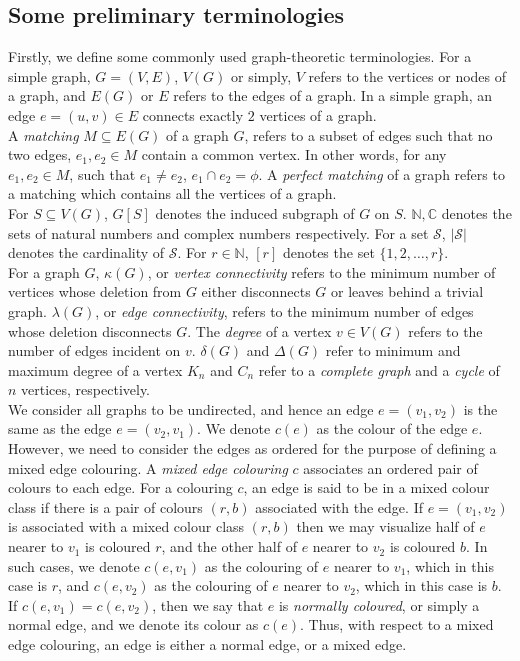\documentclass[11pt]{article}
\begin{document}
\subsection*{Some preliminary terminologies}
Firstly, we define some commonly used graph-theoretic terminologies. For a simple graph, $G=(V,E)$, $V(G)$ or simply, $V$ refers to the vertices or nodes of a graph, and $E(G)$ or $E$ refers to the edges of a graph. In a simple graph, an edge $e=(u,v) \in E$ connects exactly $2$ vertices of a graph.\\
A \textit{matching} $M \subseteq E(G)$ of a graph $G$, refers to a subset of edges such that no two edges, $e_1, e_2 \in M$ contain a common vertex. In other words, for any $e_1, e_2 \in M$, such that $e_1 \neq e_2$, $e_1 \cap e_2=\phi$. A \textit{perfect matching} of a graph refers to a matching which contains all the vertices of a graph.\\
For $S \subseteq V(G)$, $G[S]$ denotes the induced subgraph of $G$ on $S$. $\mathbb{N}, \mathbb{C}$ denotes the sets of natural numbers and complex numbers respectively. For a set $\mathcal{S}$, $|\mathcal{S}|$ denotes the cardinality of $\mathcal{S}$. For $r \in \mathbb{N}$, $[r]$ denotes the set $\{1, 2, \dots, r\}$.\\
For a graph $G$, $\kappa(G)$, or \textit{vertex connectivity} refers to the minimum number of vertices whose deletion from $G$ either disconnects $G$ or leaves behind a trivial graph. $\lambda(G)$, or \textit{edge connectivity}, refers to the minimum number of edges whose deletion disconnects $G$.
The \textit{degree} of a vertex $v \in V(G)$ refers to the number of edges incident on $v$.  $\delta(G)$ and $\Delta(G)$ refer to minimum and maximum degree of a vertex  $K_n$ and $C_n$ refer to a \textit{complete graph} and a \textit{cycle} of $n$ vertices, respectively.\\
We consider all graphs to be undirected, and hence an edge $e=(v_1,v_2)$ is the same as the edge $e=(v_2,v_1)$. We denote $c(e)$ as the colour of the edge $e$. However, we need to consider the edges as ordered for the purpose of defining a mixed edge colouring. A \textit{mixed edge colouring} $c$ associates an ordered pair of colours to each edge. For a colouring $c$, an edge is said to be in a mixed colour class if there is a pair of colours $(r,b)$ associated with the edge. If $e=(v_1,v_2)$ is associated with a mixed colour class $(r,b)$ then we may visualize half of $e$ nearer to $v_1$ is coloured $r$, and the other half of $e$ nearer to $v_2$ is coloured $b$. In such cases, we denote $c(e,v_1)$ as the colouring of $e$ nearer to $v_1$, which in this case is $r$, and $c(e,v_2)$ as the colouring of $e$ nearer to $v_2$, which in this case is $b$. If $c(e,v_1)=c(e,v_2)$, then we say that $e$ is \textit{normally coloured}, or simply a normal edge, and we denote its colour as $c(e)$. Thus, with respect to a mixed edge colouring, an edge is either a normal edge, or a mixed edge.\medskip\\
\end{document}
